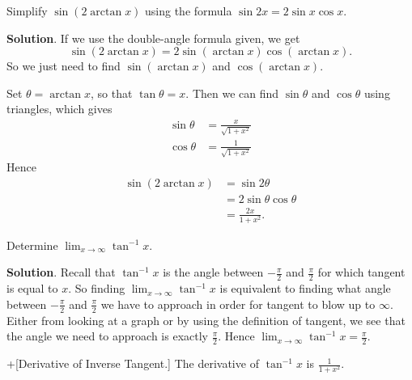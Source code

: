 \documentclass[10pt,]{book}
\theoremstyle{ptxplainnotitle}
\theoremstyle{ptxplaintitle}
\theoremstyle{ptxplainnotitle}
\theoremstyle{ptxplaintitle}
\theoremstyle{ptxplainnotitle}
\theoremstyle{ptxplaintitle}
\theoremstyle{ptxdefinitionnotitle}
\theoremstyle{ptxdefinitiontitle}
\theoremstyle{ptxdefinitionnotitle}
\theoremstyle{ptxdefinitiontitle}
\theoremstyle{ptxdefinitionnotitle}
\theoremstyle{ptxdefinitiontitle}
\theoremstyle{ptxdefinitionnotitle}
\theoremstyle{ptxdefinitiontitle}
\theoremstyle{ptxdefinitionnotitle}
\theoremstyle{ptxdefinitiontitle}
\numberwithin{equation}{section}
\begin{document}
\begin{example}\label{example-simplifying-an-inverse-tangent}
\hypertarget{p-273}{}%
Simplify \(\sin(2\arctan x)\) using the formula \(\sin2x = 2\sin x\cos x\).%
\par\smallskip%
\noindent\textbf{Solution}.\hypertarget{solution-59}{}\quad%
\hypertarget{p-274}{}%
If we use the double-angle formula given, we get%
\begin{equation*}
\sin(2\arctan x) = 2\sin(\arctan x)\cos(\arctan x).
\end{equation*}
So we just need to find \(\sin(\arctan x)\) and \(\cos(\arctan x)\).%
\par
\hypertarget{p-275}{}%
Set \(\theta = \arctan x\), so that \(\tan\theta = x\). Then we can find \(\sin\theta\) and \(\cos\theta\) using triangles, which gives%
\begin{align*}
\sin\theta & = \frac{x}{\sqrt{1+x^{2}}} \\
\cos\theta & = \frac{1}{\sqrt{1+x^{2}}} 
\end{align*}
Hence%
\begin{align*}
\sin(2\arctan x) & = \sin2\theta \\
& = 2\sin\theta\cos\theta \\
& = \frac{2x}{1+x^{2}}. 
\end{align*}
%
\end{example}
\begin{example}\label{example-limit-of-inverse-tangent}
\hypertarget{p-276}{}%
Determine \(\lim_{x\to\infty}\tan^{-1}x\).%
\par\smallskip%
\noindent\textbf{Solution}.\hypertarget{solution-60}{}\quad%
\hypertarget{p-277}{}%
Recall that \(\tan^{-1}x\) is the angle between \(-\frac{\pi}{2}\) and \(\frac{\pi}{2}\) for which tangent is equal to \(x\). So finding \(\lim_{x\to\infty}\tan^{-1}x\) is equivalent to finding what angle between \(-\frac{\pi}{2}\) and \(\frac{\pi}{2}\) we have to approach in order for tangent to blow up to \(\infty\). Either from looking at a graph or by using the definition of tangent, we see that the angle we need to approach is exactly \(\frac{\pi}{2}\). Hence \(\lim_{x\to\infty}\tan^{-1}x = \frac{\pi}{2}\).%
\end{example}
\begin{theorem}+[{Derivative of Inverse Tangent.}]\label{theorem-derivative-of-inverse-tangent}
\hypertarget{p-278}{}%
The derivative of \(\tan^{-1}x\) is \(\frac{1}{1+x^{2}}\).%
\end{theorem}
\end{document}
